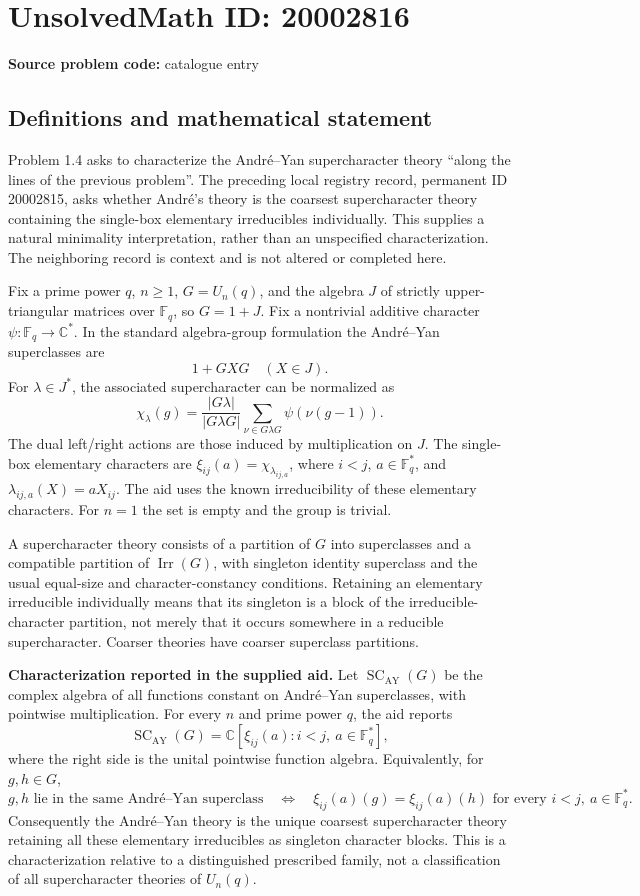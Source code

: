 \documentclass[11pt]{article}
\newcommand{\C}{\mathbb{C}}
\newcommand{\F}{\mathbb{F}}
\begin{document}
\section*{UnsolvedMath ID: 20002816}
\textbf{Source problem code:} catalogue entry
\subsection{Definitions and mathematical statement}
Problem 1.4 asks to characterize the Andr\'e--Yan supercharacter theory ``along the lines of the previous problem''. The preceding local registry record, permanent ID 20002815, asks whether Andr\'e's theory is the coarsest supercharacter theory containing the single-box elementary irreducibles individually. This supplies a natural minimality interpretation, rather than an unspecified characterization. The neighboring record is context and is not altered or completed here.

Fix a prime power \(q\), \(n\ge1\), \(G=U_n(q)\), and the algebra \(J\) of strictly upper-triangular matrices over \(\F_q\), so \(G=1+J\). Fix a nontrivial additive character \(\psi:\F_q\to\C^*\). In the standard algebra-group formulation the Andr\'e--Yan superclasses are
\[
 1+G XG\quad(X\in J).
\]
For \(\lambda\in J^*\), the associated supercharacter can be normalized as
\[
 \chi_\lambda(g)=\frac{|G\lambda|}{|G\lambda G|}
               \sum_{\nu\in G\lambda G}\psi(\nu(g-1)).
\]
The dual left/right actions are those induced by multiplication on \(J\). The single-box elementary characters are \(\xi_{ij}(a)=\chi_{\lambda_{ij,a}}\), where \(i<j\), \(a\in\F_q^*\), and \(\lambda_{ij,a}(X)=aX_{ij}\). The aid uses the known irreducibility of these elementary characters. For \(n=1\) the set is empty and the group is trivial.

A supercharacter theory consists of a partition of \(G\) into superclasses and a compatible partition of \(\operatorname{Irr}(G)\), with singleton identity superclass and the usual equal-size and character-constancy conditions. Retaining an elementary irreducible individually means that its singleton is a block of the irreducible-character partition, not merely that it occurs somewhere in a reducible supercharacter. Coarser theories have coarser superclass partitions.

\textbf{Characterization reported in the supplied aid.} Let \(\operatorname{SC}_{\mathrm{AY}}(G)\) be the complex algebra of all functions constant on Andr\'e--Yan superclasses, with pointwise multiplication. For every \(n\) and prime power \(q\), the aid reports
\[
 \operatorname{SC}_{\mathrm{AY}}(G)
       =\C[\xi_{ij}(a):i<j,\ a\in\F_q^*],
\]
where the right side is the unital pointwise function algebra. Equivalently, for \(g,h\in G\),
\[
 g,h\text{ lie in the same Andr\'e--Yan superclass}
 \quad\Longleftrightarrow\quad
 \xi_{ij}(a)(g)=\xi_{ij}(a)(h)
       \text{ for every }i<j,\ a\in\F_q^*.
\]
Consequently the Andr\'e--Yan theory is the unique coarsest supercharacter theory retaining all these elementary irreducibles as singleton character blocks. This is a characterization relative to a distinguished prescribed family, not a classification of all supercharacter theories of \(U_n(q)\).
\end{document}
